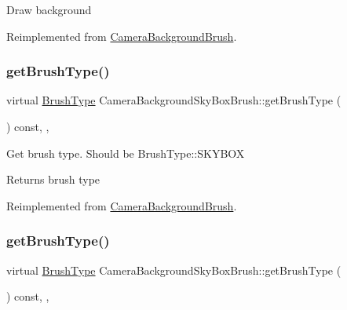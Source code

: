 Draw background 

Reimplemented from \hyperlink{classCameraBackgroundBrush_aa079883211a8ebabf567a1967b325087}{Camera\+Background\+Brush}.

\mbox{\label{classCameraBackgroundSkyBoxBrush_a2db3e09fced9ed84fb3e5df9f24bba8e}} 
\subsubsection{\texorpdfstring{get\+Brush\+Type()}{getBrushType()}\hspace{0.1cm}{\footnotesize\ttfamily [1/2]}}
{\footnotesize\ttfamily virtual \hyperlink{classCameraBackgroundBrush_acb83e8d05e7ab9386c041d22c444760f}{Brush\+Type} Camera\+Background\+Sky\+Box\+Brush\+::get\+Brush\+Type (\begin{DoxyParamCaption}{ }\end{DoxyParamCaption}) const\hspace{0.3cm}{\ttfamily [inline]}, {\ttfamily [override]}, {\ttfamily [virtual]}}

Get brush type. Should be Brush\+Type\+::\+S\+K\+Y\+B\+OX \begin{DoxyReturn}{Returns}
brush type 
\end{DoxyReturn}


Reimplemented from \hyperlink{classCameraBackgroundBrush_a72447fd86e40e0d7e263b906c2f9af12}{Camera\+Background\+Brush}.

\mbox{\label{classCameraBackgroundSkyBoxBrush_a2db3e09fced9ed84fb3e5df9f24bba8e}} 
\subsubsection{\texorpdfstring{get\+Brush\+Type()}{getBrushType()}\hspace{0.1cm}{\footnotesize\ttfamily [2/2]}}
{\footnotesize\ttfamily virtual \hyperlink{classCameraBackgroundBrush_acb83e8d05e7ab9386c041d22c444760f}{Brush\+Type} Camera\+Background\+Sky\+Box\+Brush\+::get\+Brush\+Type (\begin{DoxyParamCaption}{ }\end{DoxyParamCaption}) const\hspace{0.3cm}{\ttfamily [inline]}, {\ttfamily [override]}, {\ttfamily [virtual]}}

